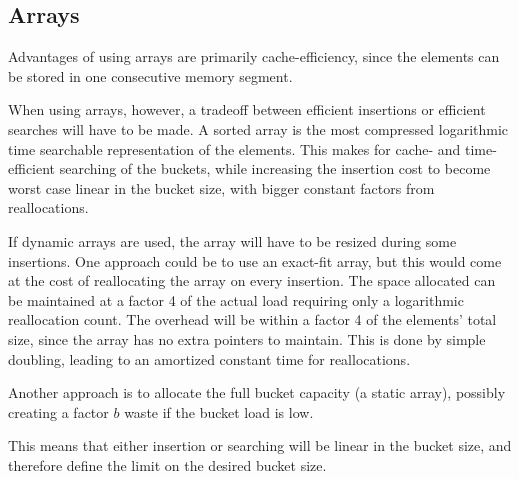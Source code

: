 \subsection{Arrays}
Advantages of using arrays are primarily cache-efficiency, since the
elements can be stored in one consecutive memory segment.

When using arrays, however, a tradeoff between efficient insertions or
efficient searches will have to be made. A sorted array is the most compressed
logarithmic time searchable representation of the elements. This makes for
cache- and time-efficient searching of the buckets, while increasing the
insertion cost to become worst case linear in the bucket size, with bigger
constant factors from reallocations.

If dynamic arrays are used, the array will have to be resized during some
insertions. One approach could be to use an exact-fit array, but this would
come at the cost of reallocating the array on every insertion. The space
allocated can be maintained at a factor 4 of the actual load requiring only a
logarithmic reallocation count. The overhead will be within a
factor 4 of the elements' total size, since the array has no extra pointers to
maintain. This is done by simple doubling, leading to an amortized constant
time for reallocations. 

Another approach is to allocate the full bucket capacity (a static array),
possibly creating a factor $b$ waste if the bucket load is low.

This means that either insertion or searching will be linear in the bucket
size, and therefore define the limit on the desired bucket size.

